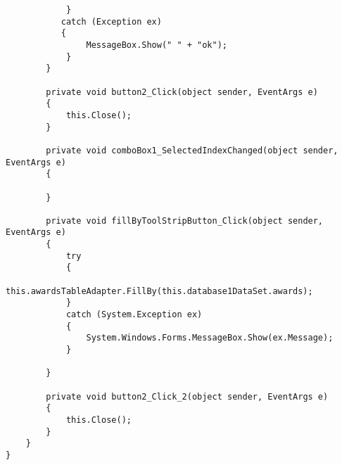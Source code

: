 \begin{lstlisting}
            }
           catch (Exception ex)
           {
                MessageBox.Show(" " + "ok");
            }
        }

        private void button2_Click(object sender, EventArgs e)
        {
            this.Close();
        }

        private void comboBox1_SelectedIndexChanged(object sender, EventArgs e)
        {

        }

        private void fillByToolStripButton_Click(object sender, EventArgs e)
        {
            try
            {
                this.awardsTableAdapter.FillBy(this.database1DataSet.awards);
            }
            catch (System.Exception ex)
            {
                System.Windows.Forms.MessageBox.Show(ex.Message);
            }

        }

        private void button2_Click_2(object sender, EventArgs e)
        {
            this.Close();
        }
    }
}
\end{lstlisting}

